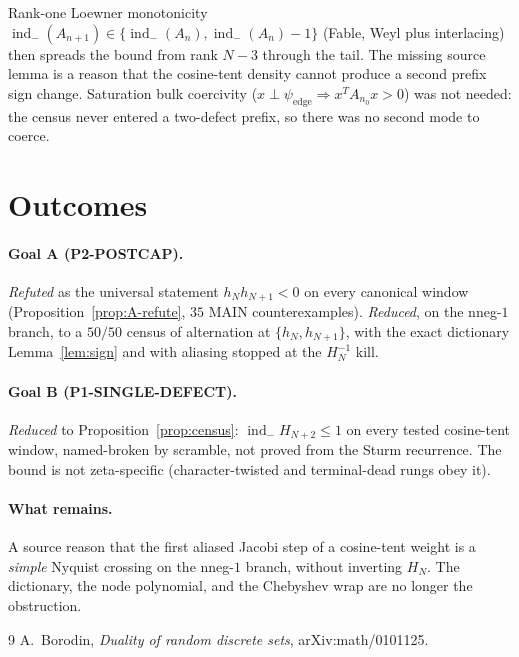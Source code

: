 \documentclass[11pt]{article}
\theoremstyle{remark}
\newcommand{\indm}{\operatorname{ind}_{-}}
\begin{document}
Rank-one Loewner monotonicity
$\indm(A_{n+1})\in\{\indm(A_n),\indm(A_n)-1\}$
(Fable, Weyl plus interlacing) then spreads the bound from rank
$N-3$ through the tail.  The missing source lemma is a reason
that the cosine-tent density cannot produce a second prefix
sign change.  Saturation bulk coercivity
($x\perp\psi_{\mathrm{edge}}\Rightarrow x^T A_{n_0}x>0$) was
not needed: the census never entered a two-defect prefix, so
there was no second mode to coerce.

\section{Outcomes}\label{sec:out}

\paragraph{Goal A (P2-POSTCAP).}
\emph{Refuted} as the universal statement $h_N h_{N+1}<0$ on
every canonical window (Proposition~\ref{prop:A-refute},
$35$ MAIN counterexamples).
\emph{Reduced}, on the nneg-$1$ branch, to a $50/50$ census of
alternation at $\{h_N,h_{N+1}\}$, with the exact dictionary
Lemma~\ref{lem:sign} and with aliasing stopped at the
$H_N^{-1}$ kill.

\paragraph{Goal B (P1-SINGLE-DEFECT).}
\emph{Reduced} to Proposition~\ref{prop:census}:
$\indm H_{N+2}\le 1$ on every tested cosine-tent window,
named-broken by scramble, not proved from the Sturm recurrence.
The bound is not zeta-specific (character-twisted and
terminal-dead rungs obey it).

\paragraph{What remains.}
A source reason that the first aliased Jacobi step of a
cosine-tent weight is a \emph{simple} Nyquist crossing on the
nneg-$1$ branch, without inverting $H_N$.  The dictionary, the
node polynomial, and the Chebyshev wrap are no longer the
obstruction.

\begin{thebibliography}{9}
A.~Borodin,
\textit{Duality of random discrete sets},
arXiv:math/0101125.
\end{thebibliography}
\end{document}
